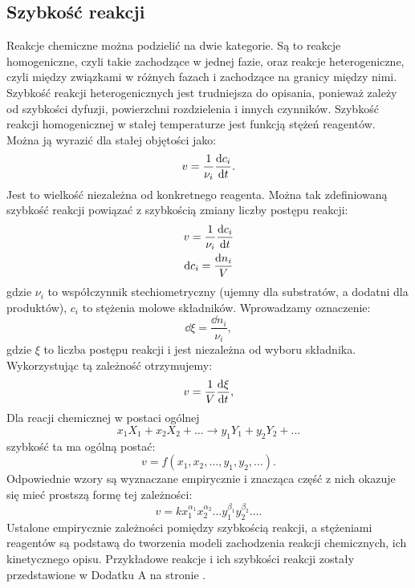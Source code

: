 \documentclass[10pt, a4paper, twoside, onecolumn]{article}
\numberwithin{equation}{section}
\begin{document}
	\subsection{Szybkość reakcji}
	Reakcje chemiczne można podzielić na dwie kategorie. Są to reakcje homogeniczne, czyli takie zachodzące w jednej fazie, oraz reakcje heterogeniczne, czyli między związkami w różnych fazach i zachodzące na granicy między nimi. Szybkość reakcji heterogenicznych jest trudniejsza do opisania, ponieważ zależy od szybkości dyfuzji, powierzchni rozdzielenia i innych czynników. %
	Szybkość reakcji homogenicznej w stałej temperaturze jest funkcją stężeń reagentów. Można ją wyrazić dla stałej objętości jako: 
	\begin{equation}
		v=\frac{1}{\nu_i}\dv{c_i}{t}.
	\end{equation}
	Jest to wielkość niezależna od konkretnego reagenta. Można tak zdefiniowaną szybkość reakcji powiązać z szybkością zmiany liczby postępu reakcji:
	\begin{gather}
		v=\frac{1}{\nu_{i}}\dv{c_{i}}{t} \\
		\dd{c_{i}}=\frac{\dd{n_{i}}}{V}
	\end{gather}
	gdzie \(\nu_{i}\) to współczynnik stechiometryczny (ujemny dla substratów, a dodatni dla produktów), \(c_{i}\) to stężenia molowe składników. Wprowadzamy oznaczenie:
	\begin{equation}
		\dd{\xi}=\frac{\dd{n_{i}}}{\nu_{i}},
	\end{equation}
	gdzie \(\xi\) to liczba postępu reakcji i jest niezależna od wyboru składnika. Wykorzystując tą zależność otrzymujemy: 
	\begin{equation}
		v=\frac{1}{V}\dv{\xi}{t},
	\end{equation}
	Dla reacji chemicznej w postaci ogólnej
	\begin{equation*}
		x_{1}X_{1}+x_{2}X_{2}+\ldots \rightarrow y_{1}Y_{1}+y_{2}Y_{2}+\ldots
	\end{equation*}
	szybkość ta ma ogólną postać:
	\begin{equation*}
		v=f\left(x_{1}, x_{2}, \ldots, y_{1}, y_{2}, \ldots\right).
	\end{equation*}
	Odpowiednie wzory są wyznaczane empirycznie i znacząca część z nich okazuje się mieć prostszą formę tej zależności:
	\begin{equation}\label{szybkosc reakcji}
		v=k x_{1}^{\alpha_1}x_{2}^{\alpha_2}\ldots y_{1}^{\beta_1}y_{2}^{\beta_2}\ldots.
	\end{equation}
	Ustalone empirycznie zależności pomiędzy szybkością reakcji, a stężeniami reagentów są podstawą do tworzenia modeli zachodzenia reakcji chemicznych, ich kinetycznego opisu. Przykładowe reakcje i ich szybkości reakcji zostały przedstawione w Dodatku A na stronie \pageref{sec: dodatek A}.
	
\end{document}
